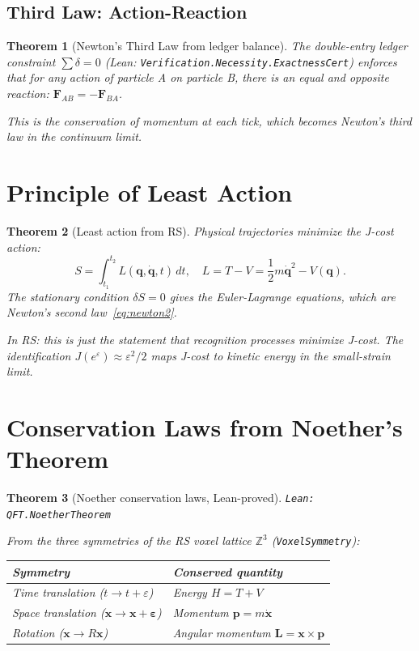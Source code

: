\documentclass[12pt,a4paper]{article}
\newtheorem{theorem}{Theorem}[section]
\theoremstyle{definition}
\theoremstyle{remark}
\begin{document}
\subsection{Third Law: Action-Reaction}

\begin{theorem}[Newton's Third Law from ledger balance]\label{thm:third}
The double-entry ledger constraint $\sum \delta = 0$ (Lean:
\texttt{Verification.Necessity.ExactnessCert}) enforces that for any
action of particle A on particle B, there is an equal and opposite reaction:
$\mathbf{F}_{AB} = -\mathbf{F}_{BA}$.

This is the conservation of momentum at each tick, which becomes Newton's
third law in the continuum limit.
\end{theorem}

\section{Principle of Least Action}

\begin{theorem}[Least action from RS]\label{thm:action}
Physical trajectories minimize the J-cost action:
\begin{equation}
  S = \int_{t_1}^{t_2} L(\mathbf{q}, \dot{\mathbf{q}}, t)\,dt,
  \quad L = T - V = \frac{1}{2}m\dot{\mathbf{q}}^2 - V(\mathbf{q}).
\end{equation}
The stationary condition $\delta S = 0$ gives the Euler-Lagrange equations,
which are Newton's second law~\eqref{eq:newton2}.

In RS: this is just the statement that recognition processes minimize
J-cost.  The identification $J(e^\varepsilon) \approx \varepsilon^2/2$
maps J-cost to kinetic energy in the small-strain limit.
\end{theorem}

\section{Conservation Laws from Noether's Theorem}

\begin{theorem}[Noether conservation laws, Lean-proved]\label{thm:noether}
\texttt{Lean: QFT.NoetherTheorem}

From the three symmetries of the RS voxel lattice $\mathbb{Z}^3$
(\texttt{VoxelSymmetry}):
\begin{center}
\begin{tabular}{ll}
\toprule
Symmetry & Conserved quantity \\
\midrule
Time translation ($t \to t + \varepsilon$) & Energy $H = T + V$ \\
Space translation ($\mathbf{x} \to \mathbf{x} + \boldsymbol{\varepsilon}$) & Momentum $\mathbf{p} = m\dot{\mathbf{x}}$ \\
Rotation ($\mathbf{x} \to R\mathbf{x}$) & Angular momentum $\mathbf{L} = \mathbf{x}\times\mathbf{p}$ \\
\bottomrule
\end{tabular}
\end{center}
\end{theorem}
\end{document}
